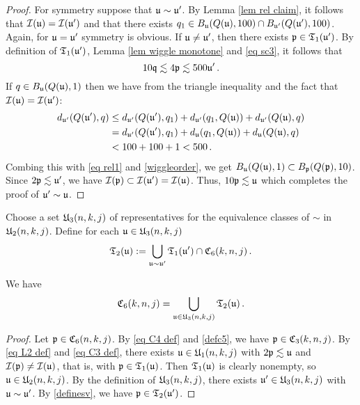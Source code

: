 \begin{proof}
    For symmetry suppose that $\mathfrak u \sim \mathfrak u'$. By Lemma \eqref{lem rel claim}, it follows that $\mathcal{I}(\mathfrak u) = \mathcal{I}(\mathfrak u')$ and that there exists $q_1 \in B_{\mathfrak u}(Q(\mathfrak u), 100) \cap B_{\mathfrak u'}(Q(\mathfrak u'), 100)$. Again, for $\mathfrak u = \mathfrak u'$ symmetry is obvious. If $\mathfrak u \ne \mathfrak u'$, then there exists $\mathfrak p \in \mathfrak{T}_1(\mathfrak u')$. By definition of $\mathfrak{T}_1(\mathfrak u')$, Lemma \ref{lem wiggle monotone} and \eqref{eq sc3}, it follows that
    \begin{equation}
        \label{eq rel1}
        10 \mathfrak q \lesssim 4\mathfrak p \lesssim 500 \mathfrak u'\,.
    \end{equation}
    If $q \in B_{\mathfrak u}(Q(\mathfrak u),1)$ then we have from the triangle inequality and the fact that $\mathcal{I}(\mathfrak u) = \mathcal{I}(\mathfrak u')$:
    \begin{align*}
        d_{\mathfrak u'}(Q(\mathfrak u'), q) &\le d_{\mathfrak u'}(Q(\mathfrak u'), q_1) + d_{\mathfrak u'}(q_1, Q(\mathfrak u)) + d_{\mathfrak u'}(Q(\mathfrak u), q)\\
        &= d_{\mathfrak u'}(Q(\mathfrak u'), q_1) + d_{\mathfrak u}(q_1, Q(\mathfrak u)) + d_{\mathfrak u}(Q(\mathfrak u), q)\\
        &< 100 + 100 + 1 < 500\,.
    \end{align*}
    Combing this with \eqref{eq rel1} and \eqref{wiggleorder}, we get $B_{\mathfrak u}(Q(\mathfrak u), 1) \subset B_{\mathfrak p}(Q(\mathfrak p), 10)$. Since $2\mathfrak p \lesssim \mathfrak u'$, we have $\mathcal{I}(\mathfrak p) \subset \mathcal{I}(\mathfrak u') = \mathcal{I}(\mathfrak u)$. Thus, $10\mathfrak p \lesssim \mathfrak u$ which completes the proof of $\mathfrak u' \sim \mathfrak u$.
\end{proof}

Choose a set  $\mathfrak U_3(n,k,j)$ of representatives for the equivalence
classes of $\sim$ in $\mathfrak U_2(n,k,j)$.
Define for each $\mathfrak u\in \mathfrak U_3(n,k,j)$
\begin{equation}\label{definesv}
\mathfrak T_2(\mathfrak u):=
   \bigcup_{\mathfrak u\sim \mathfrak u'}\mathfrak{T}_1(\mathfrak u')\cap \mathfrak C_6(k,n,j)\, .
\end{equation}

\begin{lemma}
\label{eq forest union}
We have
\begin{equation}
    \mathfrak C_6(k,n,j)=\bigcup_{\mathfrak u\in \mathfrak U_3(n,k,j)}\mathfrak{T}_2(\mathfrak u)\, .
\end{equation}
\end{lemma}
\begin{proof}
    Let $\mathfrak p \in \mathfrak C_6(n,k,j)$.
    By \eqref{eq C4 def} and \eqref{defc5}, we have $\mathfrak p \in \mathfrak C_3(k,n,j)$. By \eqref{eq L2 def} and \eqref{eq C3 def}, there exists $\mathfrak u \in \mathfrak U_1(n,k,j)$ with $2\mathfrak p \lesssim \mathfrak u$ and $\mathcal{I}(\mathfrak p) \ne \mathcal{I}(\mathfrak u)$, that is, with $\mathfrak p \in \mathfrak{T}_1(\mathfrak u)$. Then $\mathfrak{T}_1(\mathfrak u)$ is clearly nonempty, so $\mathfrak u \in \mathfrak U_2(n,k,j)$. By the definition of $\mathfrak U_3(n,k,j)$, there exists $\mathfrak u' \in \mathfrak U_3(n,k,j)$ with $\mathfrak u \sim \mathfrak u'$. By \eqref{definesv}, we have $\mathfrak p \in \mathfrak{T}_2(\mathfrak u')$.
\end{proof}

